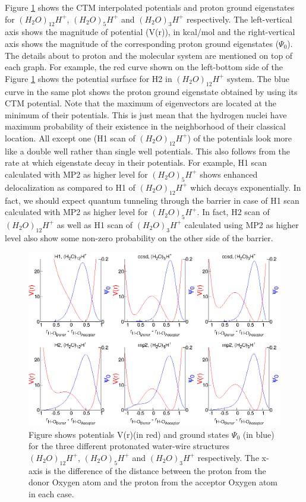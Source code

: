 Figure \ref{chap3fig8} shows the CTM interpolated potentials and proton ground eigenstates for $(H_{2}O)_{12}H^+$,
$(H_{2}O)_5H^+$ and $(H_{2}O)_3H^+$ respectively. The left-vertical axis shows the magnitude of potential (V(r)),
in kcal/mol and the right-vertical axis shows the magnitude of the corresponding proton ground eigenstates
($\Psi_{0}$). The details about to proton and the molecular system are mentioned on top of each graph. For
example, the red curve shown on the left-bottom side of the Figure \ref{chap3fig8} shows the potential surface for
H2 in $(H_{2}O)_{12}H^+$ system. The blue curve in the same plot shows the proton ground eigenstate obtained
by using its CTM potential. Note that the maximum of eigenvectors are located at the minimum of their potentials.
This is just mean that the hydrogen nuclei have maximum probability of their existence in the neighborhood of
their classical location. All except one (H1 scan of $(H_{2}O)_{12}H^+$) of the potentials look more like a double well rather than single well potentials. This also follows from the rate at which eigenstate decay in their
potentials. For example, H1 scan calculated with MP2 as higher level for $(H_{2}O)_{5}H^+$ shows enhanced
delocalization as compared to H1 of $(H_{2}O)_{12}H^+$ which decays exponentially. In fact, we should expect
quantum tunneling through the barrier in case of H1 scan calculated with MP2 as higher level for
$(H_{2}O)_{5}H^+$. In fact, H2 scan of $(H_{2}O)_{12}H^+$ as well as H1 scan of $(H_{2}O)_{3}H^+$ calculated using
MP2 as higher level also show some non-zero probability on the other side of the barrier.

\begin{figure}[H]
  \begin{center}
    \includegraphics[width=1\textwidth]{figures/wwE.eps}
    \caption{\label{chap3fig8} Figure shows potentials V(r)(in red) and ground states \(\Psi_{0}\) (in blue)
    for the three different protonated water-wire structures $(H_{2}O)_{12}H^+$, $(H_{2}O)_5H^+$  and
    $(H_{2}O)_3H^+$ respectively. The x-axis is the difference of the distance between the proton from the
    donor Oxygen atom and the proton from the acceptor Oxygen atom in each case.}
  \end{center}
\end{figure}

